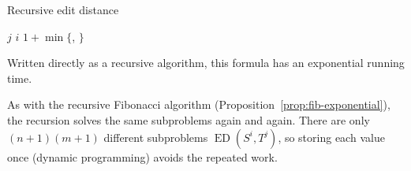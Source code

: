 \documentclass[a4paper,12pt,oneside]{report}
\newcommand{\ED}{\operatorname{ED}}
\begin{document}
\begin{framedalgo}{Recursive edit distance}\label{alg:ed-recursive}
\begin{algorithmic}[1]
      \State \Return $j$
      \State \Return $i$
      \State \Return {}
    \Else
      \State \Return $1+\min\bigl\{$,
        $\bigr\}$
    \EndIf
  \EndFunction
\end{algorithmic}
\end{framedalgo}

Written directly as a recursive algorithm, this formula has an
exponential running time.

\begin{notebox}
As with the recursive Fibonacci algorithm
(Proposition~\ref{prop:fib-exponential}), the recursion solves the
same subproblems again and again. There are only $(n+1)(m+1)$
different subproblems $\ED(S^i,T^j)$, so storing each value once
(dynamic programming) avoids the repeated work.
\end{notebox}
\end{document}
